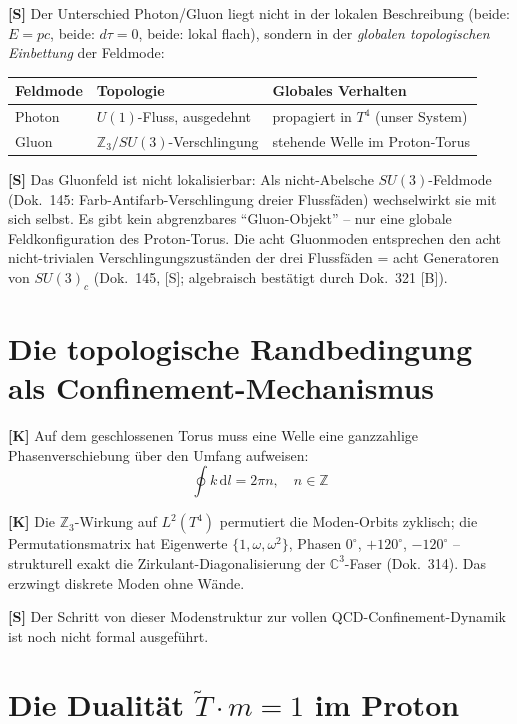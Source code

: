\textbf{[S]} Der Unterschied Photon/Gluon liegt nicht in der lokalen
Beschreibung (beide: $E=pc$, beide: $d\tau=0$, beide: lokal flach),
sondern in der \emph{globalen topologischen Einbettung} der Feldmode:

\begin{center}
\begin{tabular}{lll}
\toprule
Feldmode & Topologie & Globales Verhalten \\
\midrule
Photon & $U(1)$-Fluss, ausgedehnt & propagiert in $T^4$ (unser System) \\
Gluon & $\mathbb{Z}_3/SU(3)$-Verschlingung & stehende Welle im Proton-Torus \\
\bottomrule
\end{tabular}
\end{center}

\textbf{[S]} Das Gluonfeld ist nicht lokalisierbar: Als
nicht-Abelsche $SU(3)$-Feldmode (Dok.~145: Farb-Antifarb-Verschlingung
dreier Flussfäden) wechselwirkt sie mit sich selbst. Es gibt kein
abgrenzbares ``Gluon-Objekt'' -- nur eine globale Feldkonfiguration
des Proton-Torus. Die acht Gluonmoden entsprechen den acht
nicht-trivialen Verschlingungszuständen der drei Flussfäden =
acht Generatoren von $SU(3)_c$ (Dok.~145, [S]; algebraisch best\"{a}tigt
durch Dok.~321 [B]).

\section{Die topologische Randbedingung als Confinement-Mechanismus}

\textbf{[K]} Auf dem geschlossenen Torus muss eine Welle eine
ganzzahlige Phasenverschiebung über den Umfang aufweisen:
\begin{equation}
  \oint k \, \mathrm{d}l = 2\pi n, \quad n \in \mathbb{Z}
\end{equation}

\textbf{[K]} Die $\mathbb{Z}_3$-Wirkung auf $L^2(T^4)$ permutiert
die Moden-Orbits zyklisch; die Permutationsmatrix hat Eigenwerte
$\{1, \omega, \omega^2\}$, Phasen $0^\circ$, $+120^\circ$,
$-120^\circ$ -- strukturell exakt die Zirkulant-Diagonalisierung
der $\mathbb{C}^3$-Faser (Dok.~314). Das erzwingt diskrete Moden
ohne Wände.

\textbf{[S]} Der Schritt von dieser Modenstruktur zur vollen
QCD-Confinement-Dynamik ist noch nicht formal ausgeführt.

\section{Die Dualität $\tilde{T} \cdot m = 1$ im Proton}

